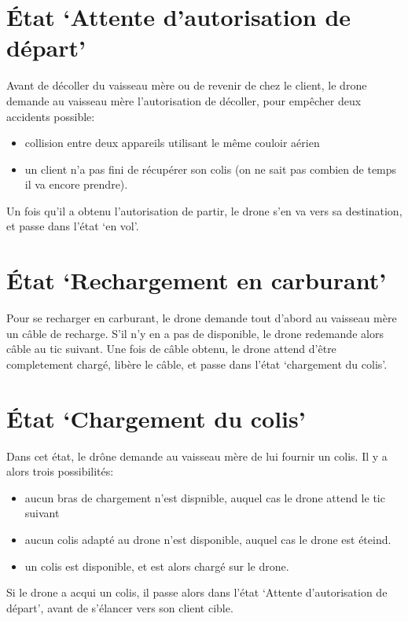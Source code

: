 \section{État `Attente d'autorisation de départ'}
    Avant de décoller du vaisseau mère ou de revenir de chez le client, le drone demande au vaisseau mère
    l'autorisation de décoller, pour empêcher deux accidents possible:
    \begin{itemize}
        \item collision entre deux appareils utilisant le même couloir aérien
        \item un client n'a pas fini de récupérer son colis (on ne sait pas combien de temps il va encore prendre).
    \end{itemize}
    Un fois qu'il a obtenu l'autorisation de partir, le drone s'en va vers sa destination, et passe dans l'état `en vol'.

\section{État `Rechargement en carburant'}
    Pour se recharger en carburant, le drone demande tout d'abord au vaisseau mère un câble de recharge.
    S'il n'y en a pas de disponible, le drone redemande alors câble au tic suivant.
    Une fois de câble obtenu, le drone attend d'être completement chargé, libère le câble,
    et passe dans l'état `chargement du colis'.

\section{État `Chargement du colis'}
    Dans cet état, le drône demande au vaisseau mère de lui fournir un colis.
    Il y a alors trois possibilités:
    \begin{itemize}
        \item aucun bras de chargement n'est dispnible, auquel cas le drone attend le tic suivant
        \item aucun colis adapté au drone n'est disponible, auquel cas le drone est éteind.
        \item un colis est disponible, et est alors chargé sur le drone.
    \end{itemize}
    Si le drone a acqui un colis, il passe alors dans l'état `Attente d'autorisation de départ',
    avant de s'élancer vers son client cible.

